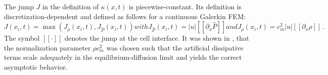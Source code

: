 \documentclass[review]{elsarticle}
\begin{document}
The jump $J$ in the definition of $\kappa(x,t)$ is piecewise-constant. Its definition is discretization-dependent and defined as follows for a continuous Galerkin FEM: 
\begin{subequations}
\label{eq:equation12ter}
\begin{equation}
J(x_i,t) = \max( J_{\rho}(x_i,t), J_{\hat{P}}(x_i,t) )
\end{equation}
with
\begin{equation}
J_{\hat{P}}(x_i,t) = |u| [[\partial_x \hat{P}]]
\end{equation}
and
\begin{equation}
J_{\rho}(x_i,t) = c_m^2 |u|  [[\partial_x \rho]] \,.
\end{equation}
\end{subequations}
The symbol $[[ \cdot ]]$ denotes the jump at the cell interface. It was shown in \cite{our_jcp_radhy_paper}, that the normalization parameter $\rho c^2_m$ was chosen such that the artificial dissipative terms scale adequately in the equilibrium-diffusion limit and yields the correct asymptotic behavior. 
\end{document}
